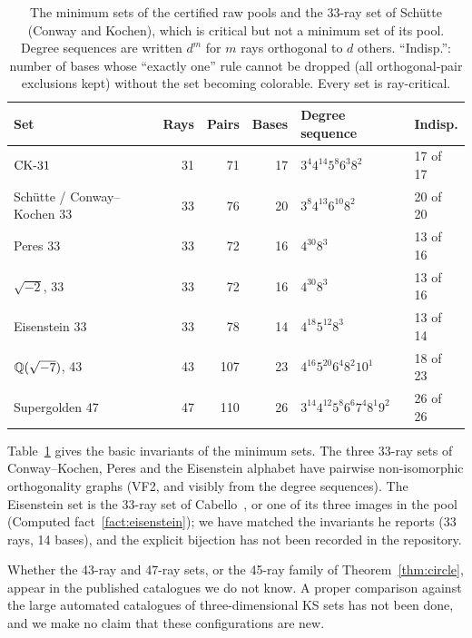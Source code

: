 \begin{table}[t]
\centering
\caption{The minimum sets of the certified raw pools and the 33-ray set of Sch\"utte (Conway
and Kochen), which is critical but not a minimum set of its pool.  Degree sequences are written
$d^{m}$ for $m$ rays orthogonal to $d$ others.  ``Indisp.'': number of bases whose ``exactly
one'' rule cannot be dropped (all orthogonal-pair exclusions kept) without the set becoming
colorable.  Every set is ray-critical.}
\label{tab:profiles}
\small
\begin{tabular}{lrrrll}
\toprule
Set & Rays & Pairs & Bases & Degree sequence & Indisp. \\
\midrule
$\mathrm{CK}\text{-}31$ & 31 & 71 & 17 & $3^{4}4^{14}5^{8}6^{3}8^{2}$ & 17 of 17 \\
Sch\"utte / Conway--Kochen 33 & 33 & 76 & 20 & $3^{8}4^{13}6^{10}8^{2}$ & 20 of 20 \\
Peres 33 & 33 & 72 & 16 & $4^{30}8^{3}$ & 13 of 16 \\
$\sqrt{-2}$, 33 & 33 & 72 & 16 & $4^{30}8^{3}$ & 13 of 16 \\
Eisenstein 33 & 33 & 78 & 14 & $4^{18}5^{12}8^{3}$ & 13 of 14 \\
$\mathbb{Q}(\sqrt{-7})$, 43 & 43 & 107 & 23 & $4^{16}5^{20}6^{4}8^{2}10^{1}$ & 18 of 23 \\
Supergolden 47 & 47 & 110 & 26 & $3^{14}4^{12}5^{8}6^{6}7^{4}8^{1}9^{2}$ & 26 of 26 \\
\bottomrule
\end{tabular}
\end{table}

Table~\ref{tab:profiles} gives the basic invariants of the minimum sets.  The three 33-ray sets
of Conway--Kochen, Peres and the Eisenstein alphabet have pairwise non-isomorphic orthogonality
graphs (VF2, and visibly from the degree sequences).  The Eisenstein set is the 33-ray set of
Cabello~\cite{Cabello2025simplest}, or one of its three images in the pool
(Computed fact~\ref{fact:eisenstein}); we have matched the invariants he reports (33 rays, 14
bases), and the explicit bijection has not been recorded in the repository.

Whether the 43-ray and 47-ray sets, or the 45-ray family of Theorem~\ref{thm:circle}, appear in
the published catalogues we do not know.  A proper comparison against the large automated
catalogues of three-dimensional KS sets has not been done, and we make no claim that these
configurations are new.
